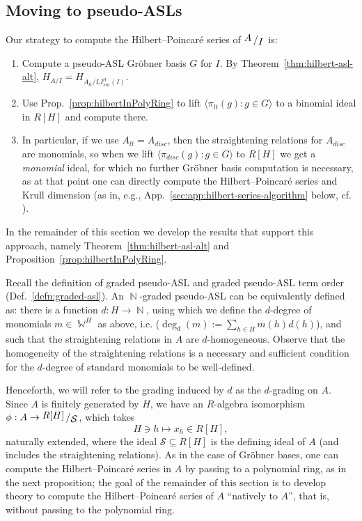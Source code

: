 \documentclass[11pt,reqno]{amsart}
\DeclareMathOperator{\N}{\mathbb{N}}
\DeclareMathOperator{\W}{\mathbb{W}}
\newcommand{\bigslant}[2]{{\raisebox{.2em}{$#1$}\left/\raisebox{-.2em}{$#2$}\right.}}
\newcommand{\lism}{LI_{sm}}
\theoremstyle{definition}
\numberwithin{equation}{section}
\begin{document}
\subsection{Moving to pseudo-ASLs}
\label{sec:hilbert-asl}
Our strategy to compute the Hilbert--Poincaré series of $\bigslant{A}{I}$ is:
\begin{enumerate}
\item Compute a pseudo-ASL Gröbner basis $G$ for $I$. By Theorem~\ref{thm:hilbert-asl-alt}, $H_{A/I} = H_{A_{lt} / \lism^{lt}(I)}$.

\item Use Prop.~\ref{prop:hilbertInPolyRing} to lift $\langle \pi_{lt}(g) : g \in G \rangle$ to a binomial ideal in $R[H]$ and compute there.

\item In particular, if we use $A_{lt} = A_{disc}$, then the straightening relations for $A_{disc}$ are monomials, so when we lift $\langle \pi_{disc}(g) : g \in G \rangle$ to $R[H]$ we get a \emph{monomial} ideal, for which no further Gröbner basis computation is necessary, as at that point one can directly compute the Hilbert--Poincaré series and Krull dimension (as in, e.g., App.~\ref{sec:app:hilbert-series-algorithm} below, cf. \cite[\S 10.2, Thm.~6]{CLO}).
\end{enumerate}
In the remainder of this section we develop the results that support this approach, namely Theorem~\ref{thm:hilbert-asl-alt} and Proposition~\ref{prop:hilbertInPolyRing}.

Recall the definition of graded pseudo-ASL and graded pseudo-ASL term order (Def.~\ref{defn:graded-asl}). An $\N$-graded pseudo-ASL can be equivalently defined as: there is a function $d \colon H \to \N$, using which we define the $d$-degree of monomials $m \in \W^H$ as above, i.e. ($\deg_d(m) := \sum_{h \in H} m(h) d(h)$), and such that the straightening relations in $A$ are $d$-homogeneous. Observe that the homogeneity of the straightening relations is a necessary and sufficient condition for the $d$-degree of standard monomials to be well-defined.

Henceforth, we will refer to the grading induced by $d$ as the $d$-grading on $A$. Since $A$ is finitely generated by $H$, we have an $R$-algebra isomorphism $\phi: A \rightarrow \bigslant{R[H]}{\mathcal{S}}$, which takes \[H \ni h \mapsto x_h \in R[H],\] naturally extended, where the ideal $\mathcal{S} \subseteq R[H]$ is the defining ideal of $A$ (and includes the straightening relations). As in the case of Gröbner bases, one can compute the Hilbert--Poincaré series in $A$ by passing to a polynomial ring, as in the next proposition; the goal of the remainder of this section is to develop theory to compute the Hilbert--Poincaré series of $A$ ``natively to $A$'', that is, without passing to the polynomial ring.
\end{document}
